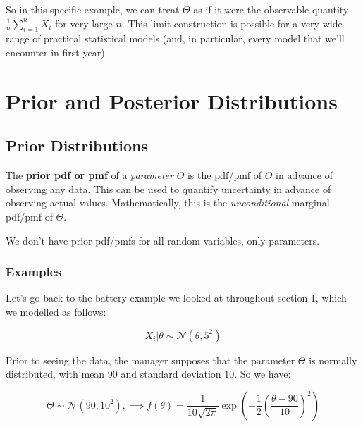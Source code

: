 \documentclass[a4paper]{article}
\begin{document}
            So in this specific example, we can treat $\Theta$ as if it were the
            observable quantity $\frac{1}{n} \sum\limits_{i=1}^n X_i$ for very
            large $n$. This limit construction is possible for a very wide range
            of practical statistical models (and, in particular, every model
            that we'll encounter in first year).

    \newpage
    \section{Prior and Posterior Distributions}
        \subsection{Prior Distributions}
            \begin{fread}
                [DS12, section 7.2]
            \end{fread}

            \begin{definition}
                The \textbf{prior pdf or pmf} of a \textit{parameter} $\Theta$
                is the pdf/pmf of $\Theta$ in advance of observing any data.
                This can be used to quantify uncertainty in advance of observing
                actual values. Mathematically, this is the
                \textit{unconditional} marginal pdf/pmf of $\Theta$.

                We don't have prior pdf/pmfs for all random variables, only
                parameters.
            \end{definition}

            \subsubsection{Examples}

                Let's go back to the battery example we looked at throughout
                section 1, which we modelled as follows:

                \[
                    X_i | \theta \sim \mathcal{N}(\theta, 5^2)
                \]

                Prior to seeing the data, the manager supposes that the
                parameter $\Theta$ is normally distributed, with mean 90 and
                standard deviation 10. So we have:

                \[
                    \Theta \sim \mathcal{N}(90, 10^2), \implies f(\theta) =
                    \frac{1}{10\sqrt{2\pi}} \exp{\left(-\frac{1}{2}\left(
                    \frac{\theta - 90}{10}\right)^2\right)}
                \]
\end{document}
